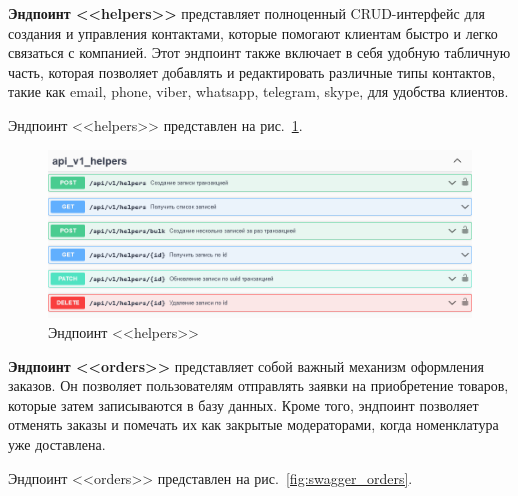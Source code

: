 \textbf{Эндпоинт <<helpers>>} представляет полноценный CRUD-интерфейс для создания и управления контактами,
которые помогают клиентам быстро и легко связаться с компанией.
Этот эндпоинт также включает в себя удобную табличную часть,
которая позволяет добавлять и редактировать различные типы контактов,
такие как email, phone, viber, whatsapp, telegram, skype, для удобства клиентов.

Эндпоинт <<helpers>> представлен на рис.~\ref{fig:swagger_helpers}.

\begin{figure}[!p]
    \centering

    \includegraphics[width=16cm]
    {images/swagger/helpers.png}

    \caption{Эндпоинт <<helpers>>}

    \label{fig:swagger_helpers}
\end{figure}

\textbf{Эндпоинт <<orders>>} представляет собой важный механизм оформления заказов.
Он позволяет пользователям отправлять заявки на приобретение товаров,
которые затем записываются в базу данных.
Кроме того, эндпоинт позволяет отменять заказы и помечать их как закрытые модераторами, когда номенклатура уже доставлена. 

Эндпоинт <<orders>> представлен на рис.~\ref{fig:swagger_orders}.

